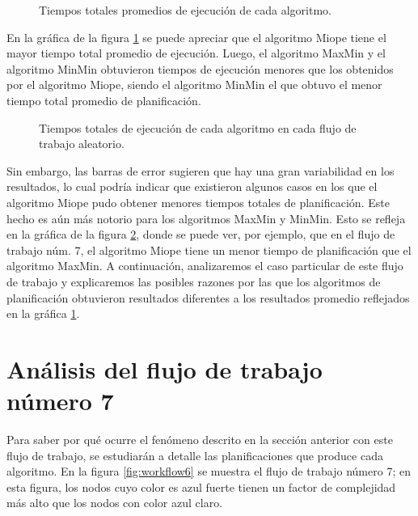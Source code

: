 \begin{figure}
\begin{center}
\end{center}
\label{fig:tiempos_promedios}
\caption{Tiempos totales promedios de ejecución de cada algoritmo.}
\end{figure}

En la gráfica de la figura \ref{fig:tiempos_promedios} se puede apreciar que el algoritmo Miope tiene el mayor tiempo total promedio de ejecución. Luego, el algoritmo MaxMin y el algoritmo MinMin obtuvieron tiempos de ejecución menores que los obtenidos por el algoritmo Miope, siendo el algoritmo MinMin el que obtuvo el menor tiempo total promedio de planificación.

\begin{figure}
\begin{center}
\end{center}
\label{fig:tiempos_totales}
\caption{Tiempos totales de ejecución de cada algoritmo en cada flujo de trabajo aleatorio.}
\end{figure}

Sin embargo, las barras de error sugieren que hay una gran variabilidad en los resultados, lo cual podría indicar que existieron algunos casos en los que el algoritmo Miope pudo obtener menores tiempos totales de planificación. Este hecho es aún más notorio para los algoritmos MaxMin y MinMin. Esto se refleja en la gráfica de la figura \ref{fig:tiempos_totales}, donde se puede ver, por ejemplo, que en el flujo de trabajo núm. 7, el algoritmo Miope tiene un menor tiempo de planificación que el algoritmo MaxMin. A continuación, analizaremos el caso particular de este flujo de trabajo y explicaremos las posibles razones por las que los algoritmos de planificación obtuvieron resultados diferentes a los resultados promedio reflejados en la gráfica \ref{fig:tiempos_promedios}.

\section{Análisis del flujo de trabajo número 7}
Para saber por qué ocurre el fenómeno descrito en la sección anterior con este flujo de trabajo, se estudiarán a detalle las planificaciones que produce cada algoritmo. En la figura \ref{fig:workflow6} se muestra el flujo de trabajo número 7; en esta figura, los nodos cuyo color es azul fuerte tienen un factor de complejidad más alto que los nodos con color azul claro.

